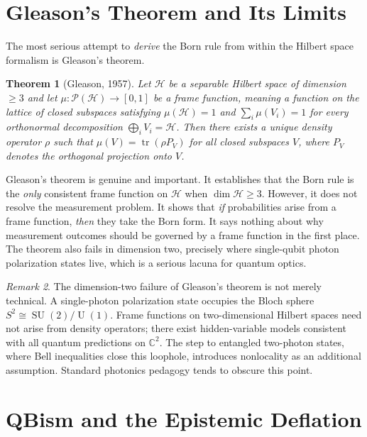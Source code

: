 \documentclass[11pt, openright, twoside]{book}
\theoremstyle{plain}
\newtheorem{theorem}{Theorem}[chapter]
\theoremstyle{definition}
\theoremstyle{remark}
\newtheorem{remark}[theorem]{Remark}
\begin{document}
\section{Gleason's Theorem and Its Limits}
\label{sec:gleason}

The most serious attempt to \emph{derive} the Born rule from within the Hilbert space formalism
is Gleason's theorem.

\begin{theorem}[Gleason, 1957]
\label{thm:gleason}
Let $\mathcal{H}$ be a separable Hilbert space of dimension $\geq 3$ and let
$\mu: \mathcal{P}(\mathcal{H}) \to [0,1]$ be a frame function, meaning a function on the
lattice of closed subspaces satisfying $\mu(\mathcal{H}) = 1$ and $\sum_i \mu(V_i) = 1$
for every orthonormal decomposition $\bigoplus_i V_i = \mathcal{H}$. Then there exists a
unique density operator $\rho$ such that $\mu(V) = \operatorname{tr}(\rho P_V)$ for all closed
subspaces $V$, where $P_V$ denotes the orthogonal projection onto $V$.
\end{theorem}

Gleason's theorem is genuine and important. It establishes that the Born rule is the
\emph{only} consistent frame function on $\mathcal{H}$ when $\dim \mathcal{H} \geq 3$.
However, it does not resolve the measurement problem. It shows that \emph{if} probabilities
arise from a frame function, \emph{then} they take the Born form. It says nothing about
why measurement outcomes should be governed by a frame function in the first place. The
theorem also fails in dimension two, precisely where single-qubit photon polarization states
live, which is a serious lacuna for quantum optics.

\begin{remark}
The dimension-two failure of Gleason's theorem is not merely technical. A single-photon
polarization state occupies the Bloch sphere $S^2 \cong \operatorname{SU}(2)/\operatorname{U}(1)$.
Frame functions on two-dimensional Hilbert spaces need not arise from density operators; there
exist hidden-variable models consistent with all quantum predictions on $\mathbb{C}^2$.
The step to entangled two-photon states, where Bell inequalities close this loophole, introduces
nonlocality as an additional assumption. Standard photonics pedagogy tends to obscure this
point.
\end{remark}

\section{QBism and the Epistemic Deflation}
\label{sec:qbism}
\end{document}
